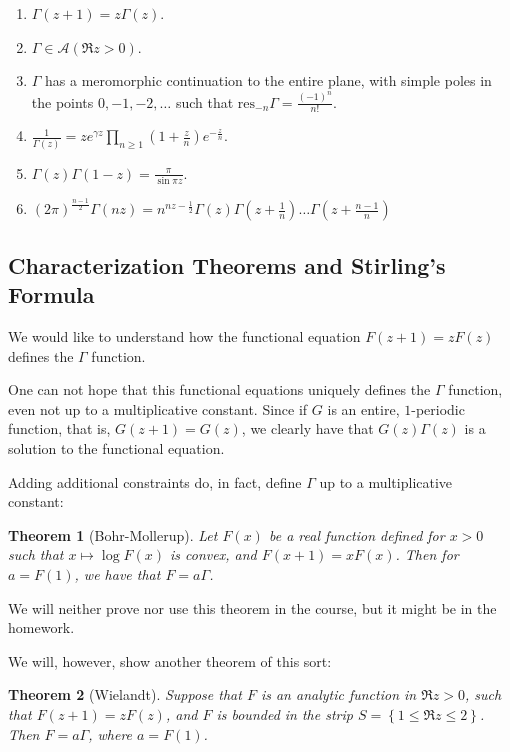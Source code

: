 \documentclass[11pt]{article} %
\newtheorem{theorem}{Theorem}[section]
\theoremstyle{definition}
\theoremstyle{remark}
\newcommand{\res}{\text{res}}
\begin{document}
\begin{enumerate}
\item $\Gamma\left(z+1\right) = z\Gamma\left(z\right)$.
\item $\Gamma \in \mathcal{A}\left(\Re z > 0\right)$.
\item $\Gamma$ has a meromorphic continuation to the entire plane, with simple poles in the points $0,-1,-2,\dots$ such that $\res_{-n} \Gamma = \frac{\left(-1\right)^n}{n!}$.
\item $\frac{1}{\Gamma\left(z\right)} = ze^{\gamma z}\prod_{n \geq 1}\left(1+\frac{z}{n}\right)e^{-\frac{z}{n}}$.
\item $\Gamma\left(z\right)\Gamma\left(1-z\right) = \frac{\pi}{\sin \pi z}$.
\item $\left(2\pi\right)^{\frac{n-1}{2}}\Gamma\left(nz\right) = n^{nz - \frac{1}{2}}\Gamma\left(z\right)\Gamma\left(z+\frac{1}{n}\right)\dots\Gamma\left(z+\frac{n-1}{n}\right)$
\end{enumerate}

\subsection{Characterization Theorems and Stirling's Formula}

We would like to understand how the functional equation $F\left(z+1\right) = zF\left(z\right)$ defines the $\Gamma$ function.

One can not hope that this functional equations uniquely defines the $\Gamma$ function, even not up to a multiplicative constant. Since if $G$ is an entire, $1$-periodic function, that is, $G\left(z+1\right) = G\left(z\right)$, we clearly have that $G\left(z\right)\Gamma\left(z\right)$ is a solution to the functional equation.

Adding additional constraints do, in fact, define $\Gamma$ up to a multiplicative constant:

\begin{theorem}[Bohr-Mollerup]
Let $F\left(x\right)$ be a real function defined for $x > 0$ such that $x \mapsto \log F\left(x\right)$ is convex, and $F\left(x + 1\right) = xF\left(x\right)$. Then for $a = F\left(1\right)$, we have that $F = a\Gamma$.
\end{theorem}

We will neither prove nor use this theorem in the course, but it might be in the homework.

We will, however, show another theorem of this sort:

\begin{theorem}[Wielandt]
Suppose that $F$ is an analytic function in $\Re z > 0$, such that $F\left(z+1\right) = zF\left(z\right)$, and $F$ is bounded in the strip $S = \left\{1 \leq \Re z \leq 2\right\}$. Then $F = a\Gamma$, where $a = F\left(1\right)$.
\end{theorem}
\end{document}
